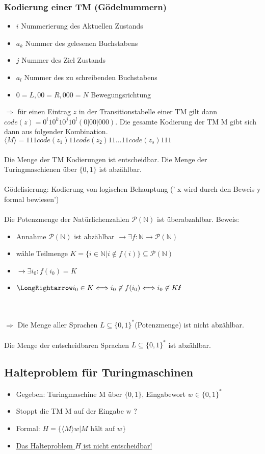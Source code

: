 \documentclass[a4paper, 10pt]{article}
\theoremstyle{definition}
\newcommand{\goedl}[1]{\langle {#1}\rangle}
\begin{document}
\subsubsection{Kodierung einer TM (Gödelnummern)}
\begin{itemize}
    \item $i$ Nummerierung des Aktuellen Zustands
    \item $a_k$ Nummer des gelesenen Buchstabens
    \item $j$ Nummer des Ziel Zustands
    \item $a_l$ Nummer des zu schreibenden Buchstabens
    \item $0=L,00=R,000=N$ Bewegungsrichtung
\end{itemize}
$\Rightarrow$ für einen Eintrag $z$ in der Transitionstabelle einer TM gilt dann 
$code(z)=0^i10^k10^j10^l(0|00|000)$. Die gesamte Kodierung der TM M gibt sich dann aus folgender Kombination.
$\goedl{M}=111code(z_1)11code(z_2)11\dots11code(z_s)111$
\\ \\
Die Menge der TM Kodierungen ist entscheidbar. Die Menge der Turingmaschienen über $\{0,1\}$ ist abzählbar.\\ \\
Gödelisierung: Kodierung von logischen Behauptung (' x wird durch den Beweis y formal bewiesen')
\\ \\ 
Die Potenzmenge der Natürlichenzahlen $\mathcal{P}(\mathbb{N})$ ist überabzahlbar. Beweis: \begin{itemize}
    \item Annahme $\mathcal{P}(\mathbb{N})$ ist abzählbar $\to \exists f:\mathbb{N}\to\mathcal{P}(\mathbb{N})$
    \item wähle Teilmenge $K=\{i\in\mathbb{N}|i\not\in f(i)\}\subseteq\mathcal{P}(\mathbb{N})$
    \item $\rightarrow \exists i_0:f(i_0)=K$
    \item $\LongRightarrow i_0\in K\Longleftrightarrow i_0\not\in f(i_0)\Longleftrightarrow i_0\not\in K \text{\Lightning}$ 
\end{itemize}\\ \\

$\Longrightarrow$ Die Menge aller Sprachen $L\subseteq\{0,1\}^*$(Potenzmenge) ist nicht abzählbar.\\ \\
Die Menge der entscheidbaren Sprachen $L\subseteq\{0,1\}^*$ ist abzählbar.
\subsection{Halteproblem für Turingmaschinen}
\begin{itemize}
    \item Gegeben: Turingmaschine M über $\{0,1\}$, Eingabewort $w\in\{0,1\}^*$
    \item Stoppt die TM M auf der Eingabe w ?
    \item Formal: $H=\{\goedl{M}w|M\text{ hält auf }w\}$
    \item \underline{Das Halteproblem $H$ ist nicht entscheidbar!}
\end{itemize}
\end{document}
